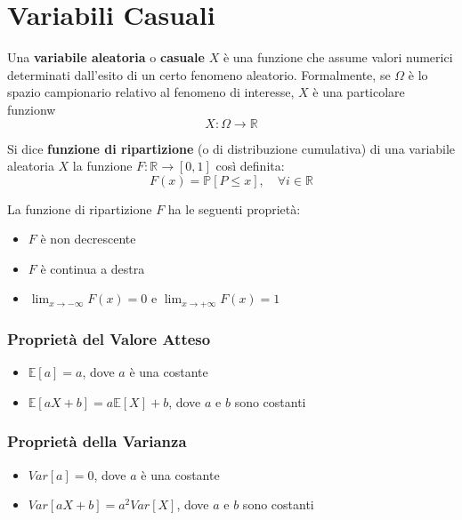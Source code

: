 \chapter{Variabili Casuali}
\begin{tcolorbox}[title=Variabili Casuali]
Una \textbf{variabile aleatoria} o \textbf{casuale} \(X\) è una funzione che assume valori numerici determinati dall’esito di un certo fenomeno aleatorio. Formalmente, se \(\Omega\) è lo spazio campionario relativo al fenomeno di interesse, \(X\) è una particolare funzionw
\[X : \Omega \rightarrow \mathbb R\]
\end{tcolorbox}

\begin{tcolorbox}[title=Funzione di Ripartizione]
Si dice \textbf{funzione di ripartizione} (o di distribuzione cumulativa) di una variabile aleatoria \(X\) la funzione \(F : \mathbb{R} \rightarrow [0, 1]\) così definita:
\[F(x) = \mathbb{P}[P \leq x], \quad \forall i \in \mathbb{R}\]

La funzione di ripartizione \(F\) ha le seguenti proprietà:
\begin{itemize}
    \item \(F\) è non decrescente
    \item \(F\) è continua a destra
    \item \(\lim_{x \rightarrow - \infty}F(x)=0\) e \(\lim_{x \rightarrow + \infty}F(x)=1\)
\end{itemize}
\end{tcolorbox}

\subsection{Proprietà del Valore Atteso}
\begin{itemize}
    \item \(\mathbb{E}[a] = a\), dove \(a\) è una costante
    \item \(\mathbb{E}[aX + b] = a\mathbb{E}[X] + b\), dove \(a\) e \(b\) sono costanti
\end{itemize}

\subsection{Proprietà della Varianza}
\begin{itemize}
    \item \(Var[a] = 0\), dove \(a\) è una costante
    \item \(Var[aX + b] = a^2Var[X]\), dove \(a\) e \(b\) sono costanti
\end{itemize}

